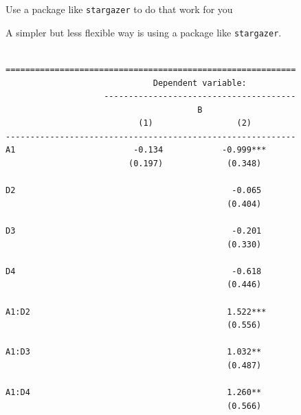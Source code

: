 \begin{frame}[fragile]{Use a package like \texttt{stargazer} to do that
work for you}

A simpler but less flexible way is using a package like
\texttt{stargazer}. \tiny

\begin{Shaded}
\begin{Highlighting}[]
 \NormalTok{)}
\end{Highlighting}
\end{Shaded}

\begin{verbatim}

===========================================================
                              Dependent variable:          
                    ---------------------------------------
                                       B                   
                           (1)                 (2)         
-----------------------------------------------------------
A1                        -0.134            -0.999***      
                         (0.197)             (0.348)       
                                                           
D2                                            -0.065       
                                             (0.404)       
                                                           
D3                                            -0.201       
                                             (0.330)       
                                                           
D4                                            -0.618       
                                             (0.446)       
                                                           
A1:D2                                        1.522***      
                                             (0.556)       
                                                           
A1:D3                                        1.032**       
                                             (0.487)       
                                                           
A1:D4                                        1.260**       
                                             (0.566)       
                                                           

\end{verbatim}
\end{frame}
